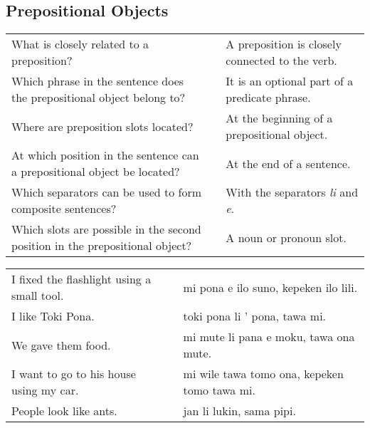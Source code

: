 \newpage
%
\subsection*{Prepositional Objects}
\label{'prepositional_objects'}
%
\begin{supertabular}{p{5,5cm}|ll}
    What is closely related to a preposition?                                    &  & A preposition is closely connected to the verb. \\ %
    Which phrase in the sentence does the prepositional object belong to?        &  & It is an optional part of a predicate phrase.   \\ %
    Where are preposition slots located?                                         &  & At the beginning of a prepositional object.     \\ %
    At which position in the sentence can a prepositional object be located?     &  & At the end of a sentence.                       \\ %
    Which separators can be used to form composite sentences?                    &  & With the separators \textit{li} and \textit{e}. \\ %
    Which slots are possible in the second position in the prepositional object? &  & A noun or pronoun slot.                         \\ %
\end{supertabular}

\begin{supertabular}{p{5,5cm}|ll}
    I fixed the flashlight using a small tool. &  & mi pona e ilo suno, kepeken ilo lili.        \\ %
    I like Toki Pona.                          &  & toki pona li ' pona, tawa mi.                \\ %
    We gave them food.                         &  & mi mute li pana e moku, tawa ona mute.       \\ %
    I want to go to his house using my car.    &  & mi wile tawa tomo ona, kepeken tomo tawa mi. \\ %
    People look like ants.                     &  & jan li lukin, sama pipi.                     \\ %
\end{supertabular}

